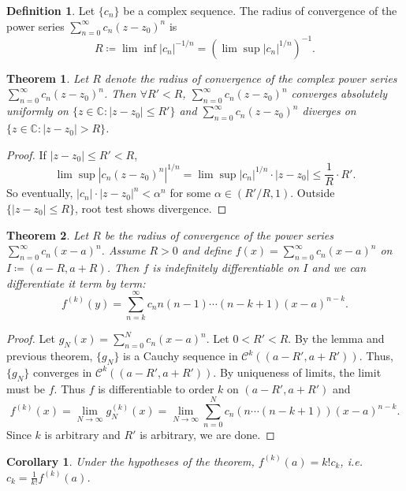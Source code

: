 \documentclass[12pt]{article}
\theoremstyle{plain}
\newtheorem{thm}{Theorem}
\newtheorem*{corollary}{Corollary}
\theoremstyle{definition}
\newtheorem*{defn}{Definition}
\begin{document}
\begin{defn}
    Let $\{c_n\}$ be a complex sequence.  The radius of convergence of the power
    series $\sum_{n=0}^\infty c_n(z-z_0)^n$
    is
    $$R\coloneqq \lim\inf |c_n|^{-1/n}=\left(\lim\sup |c_n|^{1/n}\right)^{-1}.$$
\end{defn}

\begin{thm}
    Let $R$ denote the radius of convergence of the complex power series
    $\sum_{n=0}^\infty c_n(z-z_0)^n$.
    Then $\forall R'<R$, $\sum_{n=0}^\infty c_n(z-z_0)^n$ converges absolutely uniformly on
    $\{z\in\mathbb{C}:|z-z_0|\leq R'\}$ and $\sum_{n=0}^\infty c_n(z-z_0)^n$
    diverges on $\{z\in\mathbb{C}:|z-z_0|>R\}$.
\end{thm}
\begin{proof}
    If $|z-z_0|\leq R'<R$,
    $$\lim\sup \left|c_n(z-z_0)^n\right|^{1/n}=\lim\sup |c_n|^{1/n}\cdot
    |z-z_0|\leq\frac{1}{R}\cdot R'.$$
    So eventually, $|c_n|\cdot|z-z_0|^n<\alpha^n$ for some $\alpha\in(R'/R,1)$.
    Outside $\{|z-z_0|\leq R\}$, root test shows divergence.
\end{proof}

\begin{thm}
    Let $R$ be the radius of convergence of the power series $\sum_{n=0}^\infty c_n (x-a)^n$.
    Assume $R>0$ and define $f(x)=\sum_{n=0}^\infty c_n(x-a)^n$ on $I\coloneqq (a-R,a+R)$.
    Then $f$ is indefinitely differentiable on $I$ and we can differentiate it term by term:
    $$f^{(k)}(y)=\sum_{n=k}^\infty c_n n(n-1)\cdots (n-k+1)(x-a)^{n-k}.$$
\end{thm}
\begin{proof}
    Let $g_N(x)=\sum_{n=0}^N c_n(x-a)^n$.
    Let $0<R'<R$.
    By the lemma and previous theorem, $\{g_N\}$ is a Cauchy sequence in $\mathcal{C}^k((a-R',a+R'))$.
    Thus, $\{g_N\}$ converges in $\mathcal{C}^k((a-R',a+R'))$.
    By uniqueness of limits, the limit must be $f$.
    Thus $f$ is differentiable to order $k$ on $(a-R',a+R')$ and 
    $$f^{(k)}(x)=\lim_{N\rightarrow\infty} g_N^{(k)}(x)=\lim_{N\rightarrow\infty}\sum_{n=0}^N c_n(n\cdots
    (n-k+1))(x-a)^{n-k}.$$
    Since $k$ is arbitrary and $R'$ is arbitrary, we are done.
\end{proof}

\begin{corollary}
    Under the hypotheses of the theorem, $f^{(k)}(a)=k!c_k$, i.e. $c_k=\frac{1}{k!}f^{(k)}(a)$.
\end{corollary}
\end{document}
